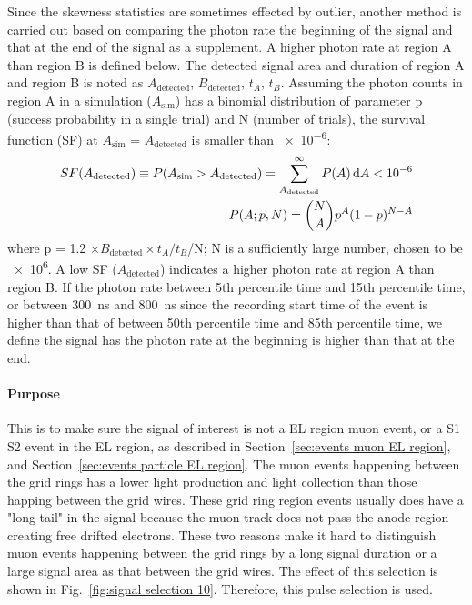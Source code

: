 Since the skewness statistics are sometimes effected by outlier, another method is carried out based on comparing the photon rate the beginning of the signal and that at the end of the signal as a supplement. A higher photon rate at region A than region B is defined below. The detected signal area and duration of region A and region B is noted as $A_{\text{detected}}$,  $B_{\text{detected}}$, $t_{A}$,  $t_{B}$. Assuming the photon counts in region A in a simulation ($A_{\text{sim}}$) has a binomial distribution of parameter p (success probability in a single trial) and N (number of trials), the survival function (SF) at $A_{\text{sim}}$ = $A_{\text{detected}}$ is smaller than \num{e-6}:
\begin{align}
SF (A_{\text{detected}}) \equiv P(A_{\text{sim}} > A_{\text{detected}}) = \sum_{A_{\text{detected}}}^{\infty} P (A) \operatorname{d}\!{A}< \num{e-6} \\
P (A; p, N) = \binom{N}{A} p^{A} (1-p)^{N-A}
\end{align}    
where p = \num{1.2} $\times B_{\text{detected}} \times t_{A}/t_{B}$/N; N is a sufficiently large number, chosen to be \num{e6}. A low SF ($A_{\text{detected}}$) indicates a higher photon rate at region A than region B. If the photon rate between 5th percentile time and 15th percentile time, or between \SI{300}{\ns} and \SI{800}{\ns} since the recording start time of the event is higher than that of between 50th percentile time and 85th percentile time, we define the signal has the photon rate at the beginning is higher than that at the end.

\paragraph{Purpose}
This is to make sure the signal of interest is not a EL region muon event, or a S1 S2 event in the EL region, as described in Section~\ref{sec:events muon EL region}, and Section~\ref{sec:events particle EL region}. The muon events happening between the grid rings has a lower light production and light collection than those happing between the grid wires. These grid ring region events usually does have a "long tail" in the signal because the muon track does not pass the anode region creating free drifted electrons. These two reasons make it hard to distinguish muon events happening between the grid rings by a long signal duration or a large signal area as that between the grid wires. The effect of this selection is shown in Fig.~\ref{fig:signal selection 10}. Therefore, this pulse selection is used.

